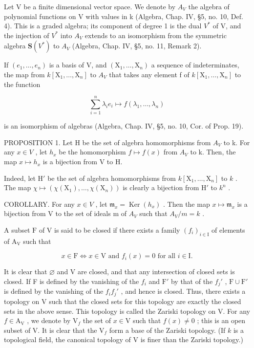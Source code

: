 
Let V be a finite dimensional vector space. We denote by \(A_{V}\) the algebra of polynomial functions on V with values in k (Algebra, Chap. IV, §5, no. 10, Def. 4). This is a graded algebra; its component of degree 1 is the dual \(V^{*}\) of V, and the injection of \(V^{*}\) into \(A_{V}\) extends to an isomorphism from the symmetric algebra \(\mathbf{S}(V^{*})\) to \(A_{V}\) (Algebra, Chap. IV, §5, no. 11, Remark 2).

If \((e_{1},\ldots,e_{n})\) is a basis of V, and \((\mathrm{X}_{1},\ldots,\mathrm{X}_{n})\) a sequence of indeterminates, the map from \(k[\mathrm{X}_{1},\ldots,\mathrm{X}_{n}]\) to \(A_{V}\) that takes any element f of \(k[\mathrm{X}_{1},\ldots,\mathrm{X}_{n}]\) to the function

\[
\sum_ {i = 1} ^ {n} \lambda_ {i} e _ {i} \mapsto f (\lambda_ {1}, \ldots , \lambda_ {n})
\]

is an isomorphism of algebras (Algebra, Chap. IV, §5, no. 10, Cor. of Prop. 19).

PROPOSITION 1. Let H be the set of algebra homomorphisms from \(A_{V}\) to k. For any \(x \in V\) , let \(h_{x}\) be the homomorphism \(f \mapsto f(x)\) from \(A_{V}\) to k. Then, the map \(x \mapsto h_{x}\) is a bijection from V to H.

Indeed, let \(\mathrm{H}'\) be the set of algebra homomorphisms from \(k[\mathrm{X}_1,\ldots ,\mathrm{X}_n]\) to \(k\) . The map \(\chi \mapsto (\chi (\mathrm{X}_1),\dots ,\chi (\mathrm{X}_n))\) is clearly a bijection from \(\mathrm{H}'\) to \(k^n\) .

COROLLARY. For any \(x \in V\) , let \(\mathfrak{m}_{x} = \operatorname{Ker}(h_{x})\) . Then the map \(x \mapsto \mathfrak{m}_{x}\) is a bijection from V to the set of ideals m of \(A_{V}\) such that \(A_{V}/m = k\) .

A subset \(\mathrm{F}\) of \(\mathrm{V}\) is said to be closed if there exists a family \((f_i)_{i\in \mathrm{I}}\) of elements of \(\mathrm{A_V}\) such that

\[
x \in \mathrm{F} \Longleftrightarrow x \in \mathrm{V} \text {   and   } f _ {i} (x) = 0 \text {   for   all   } i \in \mathrm{I}.
\]

It is clear that \(\varnothing\) and V are closed, and that any intersection of closed sets is closed. If F is defined by the vanishing of the \(f_{i}\) and \(\mathrm{F}'\) by that of the \(f_j'\) , \(\mathrm{F} \cup \mathrm{F}'\) is defined by the vanishing of the \(f_{i}f_{j}'\) , and hence is closed. Thus, there exists a topology on V such that the closed sets for this topology are exactly the closed sets in the above sense. This topology is called the Zariski topology on V. For any \(f \in \mathrm{A_V}\) , we denote by \(\mathrm{V}_f\) the set of \(x \in \mathrm{V}\) such that \(f(x) \neq 0\) ; this is an open subset of V. It is clear that the \(\mathrm{V}_f\) form a base of the Zariski topology. (If \(k\) is a topological field, the canonical topology of V is finer than the Zariski topology.)

